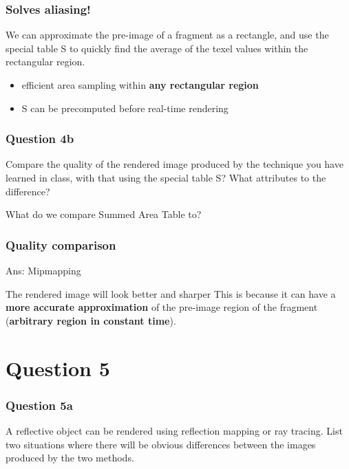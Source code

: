 \documentclass{beamer}
\begin{document}
\begin{frame}
    \frametitle{Solves \textbf{aliasing}!}

    We can approximate the pre-image of a fragment as a rectangle, 
    and use the special table S to quickly find the average of the
    texel values within the rectangular region. 
    
    \begin{itemize}
        \item efficient area sampling within \textbf{any rectangular region}
        \item S can be precomputed before real-time rendering
    \end{itemize}

\end{frame}

\begin{frame}
    \frametitle{Question 4b}

    Compare the quality of the rendered image produced by the technique you have learned in class, 
    with that using the special table S?  What attributes to the difference?

    \begin{tcolorbox}
        What do we compare Summed Area Table to?
    \end{tcolorbox}

\end{frame}

\begin{frame}
    \frametitle{Quality comparison}

    \begin{tcolorbox}
        Ans: Mipmapping
    \end{tcolorbox}

    The rendered image will look better and sharper
    This is because it can have a \textbf{more accurate approximation} of the pre-image
    region of the fragment (\textbf{arbitrary region in constant time}).

\end{frame}

\section{Question 5}

\begin{frame}
    \frametitle{Question 5a}

    A reflective object can be rendered using reflection mapping or ray tracing. List two situations 
    where there will be obvious differences between the images produced by the two methods.
\end{frame}
\end{document}
